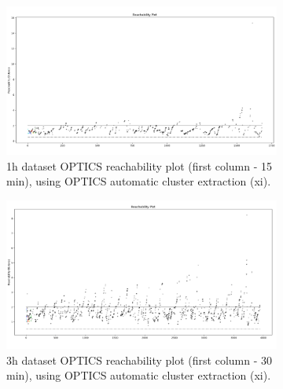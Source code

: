   \begin{figure}[H]
    \centering
    \begin{subfigure}{.5\textwidth}\captionsetup{width=.8\linewidth}
      \centering
      \includegraphics[width=1\textwidth]{./images/clusteringResults/1h-1-reachabilityPlot-xi.png}
    \caption{1h dataset OPTICS reachability plot (first column - 15 min), using OPTICS automatic cluster extraction (xi).}
    \end{subfigure}%
    \begin{subfigure}{.5\textwidth}\captionsetup{width=.8\linewidth}
      \centering
      \includegraphics[width=1\textwidth]{./images/clusteringResults/3h-1-reachabilityPlot-xi.png}
      \caption{3h dataset OPTICS reachability plot (first column - 30 min), using OPTICS automatic cluster extraction (xi).}
    \end{subfigure}
    \caption{}
    \label{figure:OPTICSResultsReachabilityPlot}
    \end{figure}

